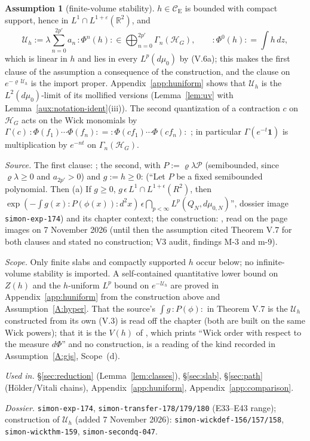 \documentclass[11pt,a4paper]{article}
\theoremstyle{plain}
\theoremstyle{definition}
\newtheorem{assumption}{Assumption}
\theoremstyle{plain}
\theoremstyle{definition}
\newcommand{\R}{\mathbb{R}}
\newcommand{\CE}{\mathcal{C}_{\mathrm E}}
\newcommand{\HH}{\mathcal{H}}
\begin{document}
\begin{assumption}[finite-volume stability]
$h\in\CE$ is bounded with compact support, hence in $L^1\cap L^{1+\varepsilon}(\R^2)$, and
\[
 \mathcal U_h:=\lambda\sum_{n=0}^{2p'}a_n\,{:}\Phi^n(h){:}\in\bigoplus_{n=0}^{2p'}\Gamma_n(\HH_G),
 \qquad {:}\Phi^0(h){:}=\int h\,dz ,
\]
which is linear in $h$ and lies in every $L^p(d\mu_0)$ by (V.6a); this makes the first clause
of the assumption a consequence of the construction, and the clause on
$e^{-\varrho\,\mathcal U_h}$ is the import proper.  Appendix~\ref{app:huniform} shows that
$\mathcal U_h$ is the $L^2(d\mu_0)$-limit of its mollified versions
(Lemma~\ref{lem:uv} with Lemma~\ref{aux:notation-ident}(iii)).  The second quantization of a
contraction $c$ on $\HH_G$ acts on the Wick monomials by $\Gamma(c)\,{:}\Phi(f_1)\cdots
\Phi(f_n){:}={:}\Phi(cf_1)\cdots\Phi(cf_n){:}$ \cite[(I.32), p.~25]{SimonBook}; in
particular $\Gamma(e^{-t}\mathbf 1)$ is multiplication by $e^{-nt}$ on $\Gamma_n(\HH_G)$.

\emph{Source.} The first clause: \cite[Thm.~V.2(a), (V.6a), p.~137]{SimonBook}; the
second, with $P:=\varrho\lambda\mathscr P$ (semibounded, since $\varrho\lambda\ge0$ and
$a_{2p'}>0$) and $g:=h\ge0$: \cite[Thm.~V.7(a), (V.28a), p.~152]{SimonBook}
(``Let $P$ be a fixed semibounded polynomial. Then (a) If $g\ge0$, $g\,\epsilon\,L^1\cap
L^{1+\epsilon}(R^2)$, then $\exp(-\int g(x){:}P(\phi(x)){:}d^2x)\,\epsilon
\bigcap_{p<\infty}L^p(Q_N,d\mu_{0,N})$'', dossier image \texttt{simon-exp-174})
and its chapter context; the construction: \cite[pp.~135--137]{SimonBook}, read on the page
images on 7 November 2026 (until then the assumption cited Theorem V.7 for both clauses and
stated no construction; V3 audit, findings M-3 and m-9).

\emph{Scope.} Only finite slabs and compactly supported $h$ occur below; no infinite-volume
stability is imported. A self-contained quantitative lower bound on $Z(h)$ and the
$h$-uniform $L^p$ bound on $e^{-\mathcal U_h}$ are proved in Appendix~\ref{app:huniform}
from the construction above and Assumption~\ref{A:hyper}.  That the source's
$\int g\,{:}P(\phi){:}$ in Theorem V.7 is the $\mathcal U_h$ constructed from its own (V.3)
is read off the chapter (both are built on the same Wick powers); that it is the $V(h)$ of
\cite[(1.8), p.~589]{GJS}, which prints ``Wick order with respect to the measure $d\Phi$''
and no construction, is a reading of the kind recorded in Assumption~\ref{A:gjs},
Scope~(d).

\emph{Used in.} \S\ref{sec:reduction} (Lemma~\ref{lem:classes}), \S\ref{sec:slab},
\S\ref{sec:path} (H\"older/Vitali chains), Appendix~\ref{app:huniform},
Appendix~\ref{app:comparison}.

{\raggedright\emph{Dossier.} \texttt{simon-exp-174}, \texttt{simon-transfer-178/179/180} (E33--E43 range);
construction of $\mathcal U_h$ (added 7 November 2026): \texttt{simon-wickdef-156/157/158},
\texttt{simon-wickthm-159}, \texttt{simon-secondq-047}.\par}
\end{assumption}
\end{document}
